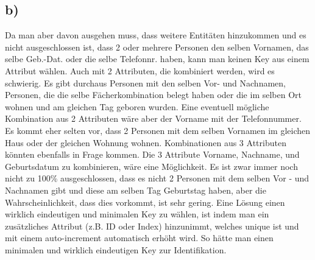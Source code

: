 \documentclass[12pt]{article}
\begin{document}
\subsection{b)}
Da man aber davon ausgehen muss, dass weitere Entitäten hinzukommen und es nicht ausgeschlossen ist, dass 2 oder mehrere Personen den selben Vornamen, das selbe Geb.-Dat. oder die selbe Telefonnr. haben, kann man keinen Key aus einem Attribut wählen. Auch mit 2 Attributen, die kombiniert werden, wird es schwierig. Es gibt durchaus Personen mit den selben Vor- und Nachnamen, Personen, die die selbe Fächerkombination belegt haben oder die im selben Ort wohnen und am gleichen Tag geboren wurden. Eine eventuell mögliche Kombination aus 2 Attributen wäre aber der Vorname mit der Telefonnummer. Es kommt eher selten vor, dass 2 Personen mit dem selben Vornamen im gleichen Haus oder der gleichen Wohnung wohnen. Kombinationen aus 3 Attributen könnten ebenfalls in Frage kommen. Die 3 Attribute Vorname, Nachname, und Geburtsdatum zu kombinieren, wäre eine Möglichkeit. Es ist zwar immer noch nicht zu 100\% ausgeschlossen, dass es nicht 2 Personen mit dem selben Vor - und Nachnamen gibt und diese am selben Tag Geburtstag haben, aber die Wahrscheinlichkeit, dass dies vorkommt, ist sehr gering. Eine Lösung einen wirklich eindeutigen und minimalen Key zu wählen, ist indem man ein zusätzliches Attribut (z.B. ID oder Index) hinzunimmt, welches unique ist und mit einem auto-increment automatisch erhöht wird.  So hätte man einen minimalen und wirklich eindeutigen Key zur Identifikation.
\end{document}
